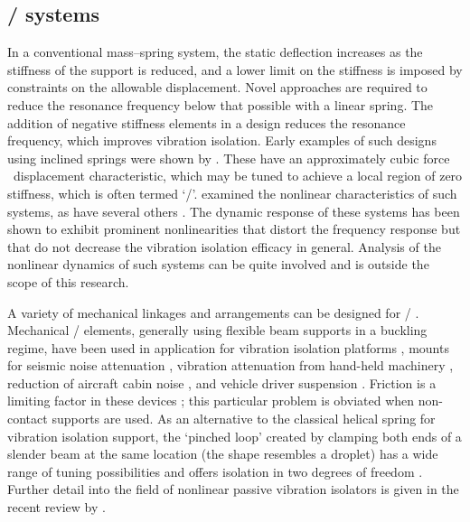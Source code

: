 \documentclass[11pt,a4paper]{memoir}
\begin{document}
\subsection{\QZS/ systems}

In a conventional mass--spring system, the static deflection increases as the stiffness of the support is reduced, and a lower limit on the stiffness is imposed by constraints on the allowable displacement.
Novel approaches are required to reduce the resonance frequency below that possible with a linear spring.
The addition of negative stiffness elements in a design reduces the resonance frequency, which improves vibration isolation.
Early examples of such designs using inclined springs were shown by \textcite{molyneux1957}.
These have an approximately cubic force \vs\ displacement characteristic, which may be tuned to achieve a local region of zero stiffness, which is often termed `\qzs/'.
\textcite{alabuzhev1989} examined the nonlinear characteristics of such systems, as have several others
\cite{carrella2007-jsv,kovacic2008,carrella2009-jsv}.
The dynamic response of these systems has been shown to exhibit prominent nonlinearities that distort the frequency response but that do not decrease the vibration isolation efficacy in general.
Analysis of the nonlinear dynamics of such systems \cite{lee2004-jsv,kovacic2008,kovacic2009} can be quite involved and is outside the scope of this research.

A variety of mechanical linkages and arrangements can be designed for \qzs/ \cite{tarnai2003}.
Mechanical \qzs/ elements, generally using flexible beam supports in a buckling regime, have been used in application for vibration isolation platforms \cite{platus1999}, mounts for seismic noise attenuation \cite{cella2005}, vibration attenuation from hand-held machinery \cite{sokolov2007}, reduction of aircraft cabin noise \cite{baklanov2007-jsv}, and vehicle driver suspension \cite{lee2007-jsv}.
Friction is a limiting factor in these devices \cite{sokolov2007}; this particular problem is obviated when non-contact supports are used.
As an alternative to the classical helical spring for vibration isolation support, the `pinched loop' created by clamping both ends of a slender beam at the same location (the shape resembles a droplet) has a wide range of tuning possibilities and offers isolation in two degrees of freedom \parencite{virgin2008}.
Further detail into the field  of nonlinear passive vibration isolators is given in the recent review by \textcite{ibrahim2008}.
\end{document}
